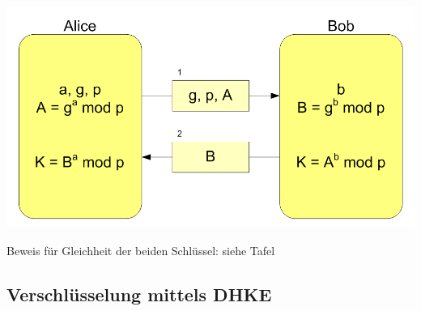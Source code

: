 \documentclass[utf8]{beamer}
\begin{document}
\begin{frame}{\insertsubsectionhead}
  \begin{center}
    \includegraphics[width=\textwidth]{Diffie-Hellman-Schluesselaustausch2.png}
  \end{center}
  Beweis für Gleichheit der beiden Schlüssel: siehe Tafel
\end{frame}

\subsection{Verschlüsselung mittels DHKE}
\label{sub:verschlusselung_mittels_dhke}
\end{document}

